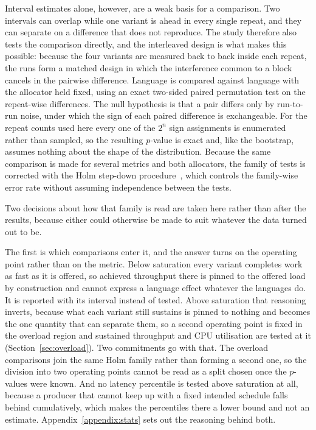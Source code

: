 \documentclass[english,oneside,a4paper,censored,csm,software-track-2020]{HYthesisML}
\begin{document}
\begin{appendices}
Interval estimates alone, however, are a weak basis for a comparison. Two intervals can overlap
while one variant is ahead in every single repeat, and they can separate on a difference that
does not reproduce. The study therefore also tests the comparison directly, and the interleaved
design is what makes this possible: because the four variants are measured back to back inside
each repeat, the runs form a matched design in which the interference common to a block cancels
in the pairwise difference. Language is compared against language with the allocator held
fixed, using an exact two-sided paired permutation test on the repeat-wise differences. The
null hypothesis is that a pair differs only by run-to-run noise, under which the sign of each
paired difference is exchangeable. For the repeat counts used here every one of the $2^{n}$
sign assignments is enumerated rather than sampled, so the resulting $p$-value is exact and,
like the bootstrap, assumes nothing about the shape of the distribution. Because the same
comparison is made for several metrics and both allocators, the family of tests is corrected
with the Holm step-down procedure~\cite{holm1979simple}, which controls the family-wise error
rate without assuming independence between the tests.

Two decisions about how that family is read are taken here rather than after the results,
because either could otherwise be made to suit whatever the data turned out to be.

The first is which comparisons enter it, and the answer turns on the operating point rather than
on the metric. Below saturation every variant completes work as fast as it is offered, so achieved
throughput there is pinned to the offered load by construction and cannot express a language
effect whatever the languages do. It is reported with its interval instead of tested. Above
saturation that reasoning inverts, because what each variant still sustains is pinned to nothing
and becomes the one quantity that can separate them, so a second operating point is fixed in the
overload region and sustained throughput and CPU utilisation are tested at it
(Section~\ref{sec:overload}). Two commitments go with that. The overload comparisons join the same
Holm family rather than forming a second one, so the division into two operating points cannot be
read as a split chosen once the $p$-values were known. And no latency percentile is tested above
saturation at all, because a producer that cannot keep up with a fixed intended schedule falls
behind cumulatively, which makes the percentiles there a lower bound and not an estimate.
Appendix~\ref{appendix:stats} sets out the reasoning behind both.


\end{appendices}
\end{document}
